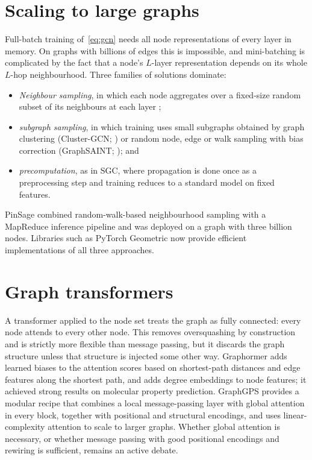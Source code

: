 \documentclass[11pt]{article}
\theoremstyle{plain}
\theoremstyle{definition}
\begin{document}
\section{Scaling to large graphs}
\label{sec:scale}

Full-batch training of~\eqref{eq:gcn} needs all node representations of every layer in memory. On graphs with billions of edges this is impossible, and mini-batching is complicated by the fact that a node's $L$-layer representation depends on its whole $L$-hop neighbourhood. Three families of solutions dominate:
\begin{itemize}
  \item \emph{Neighbour sampling}, in which each node aggregates over a fixed-size random subset of its neighbours at each layer \citep{hamilton2017};
  \item \emph{subgraph sampling}, in which training uses small subgraphs obtained by graph clustering (Cluster-GCN; \citealp{chiang2019}) or random node, edge or walk sampling with bias correction (GraphSAINT; \citealp{zeng2020}); and
  \item \emph{precomputation}, as in SGC, where propagation is done once as a preprocessing step and training reduces to a standard model on fixed features.
\end{itemize}
PinSage \citep{ying2018} combined random-walk-based neighbourhood sampling with a MapReduce inference pipeline and was deployed on a graph with three billion nodes. Libraries such as PyTorch Geometric \citep{fey2019} now provide efficient implementations of all three approaches.

\section{Graph transformers}
\label{sec:transformers}

A transformer applied to the node set treats the graph as fully connected: every node attends to every other node. This removes oversquashing by construction and is strictly more flexible than message passing, but it discards the graph structure unless that structure is injected some other way. Graphormer \citep{ying2021} adds learned biases to the attention scores based on shortest-path distances and edge features along the shortest path, and adds degree embeddings to node features; it achieved strong results on molecular property prediction. GraphGPS \citep{rampasek2022} provides a modular recipe that combines a local message-passing layer with global attention in every block, together with positional and structural encodings, and uses linear-complexity attention to scale to larger graphs. Whether global attention is necessary, or whether message passing with good positional encodings and rewiring is sufficient, remains an active debate.
\end{document}
